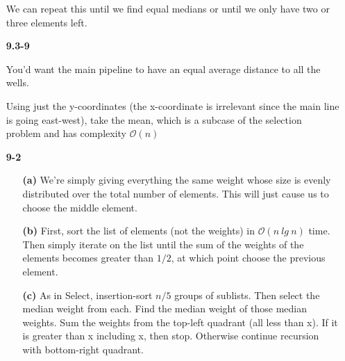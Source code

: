 \documentclass{article}
\begin{document}
\begin{enumerate}
	We can repeat this until we find equal medians or until we only have two or three elements left.

\item[\textbf{9.3-9}]

You'd want the main pipeline to have an equal average distance to all the wells.

Using just the y-coordinates (the x-coordinate is irrelevant since the main line is going east-west), take the mean, which is a subcase of the selection problem and has complexity $\mathcal{O}(n)$

\item[\textbf{9-2}]

	\begin{enumerate}
		\item[\textbf{(a)}]
	We're simply giving everything the same weight whose size is evenly
	distributed over the total number of elements. This will just cause us to
	choose the middle element.
		\item[\textbf{(b)}]
			First, sort the list of elements (not the weights) in $\mathcal{O}(n\ lg\
			n)$ time. Then simply iterate on the list until the sum of the weights of
			the elements becomes greater than $1/2$, at which point choose the
			previous element.
		\item[\textbf{(c)}]
			As in Select, insertion-sort $n/5$ groups of sublists. Then select the
			median weight from each. Find the median weight of those median weights.
			Sum the weights from the top-left quadrant (all less than x). If it is
			greater than x including x, then stop. Otherwise continue recursion with
			bottom-right quadrant.
			\end{enumerate}

\end{enumerate}
\end{document}
